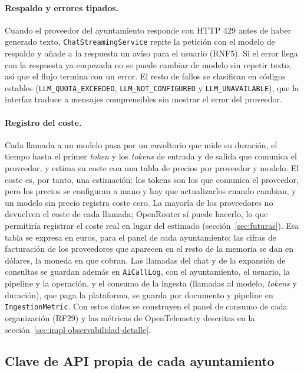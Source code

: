 \paragraph{Respaldo y errores tipados.} Cuando el proveedor del ayuntamiento responde con HTTP 429 antes de haber generado texto, \texttt{ChatStreamingService} repite la petición con el modelo de respaldo y añade a la respuesta un aviso para el usuario (RNF5). Si el error llega con la respuesta ya empezada no se puede cambiar de modelo sin repetir texto, así que el flujo termina con un error. El resto de fallos se clasifican en códigos estables (\texttt{LLM\_QUOTA\_EXCEEDED}, \texttt{LLM\_NOT\_CONFIGURED} y \texttt{LLM\_UNAVAILABLE}), que la interfaz traduce a mensajes comprensibles sin mostrar el error del proveedor.

\paragraph{Registro del coste.} Cada llamada a un modelo pasa por un envoltorio que mide su duración, el tiempo hasta el primer \emph{token} y los \emph{tokens} de entrada y de salida que comunica el proveedor, y estima su coste con una tabla de precios por proveedor y modelo. El coste es, por tanto, una estimación: los tokens son los que comunica el proveedor, pero los precios se configuran a mano y hay que actualizarlos cuando cambian, y un modelo sin precio registra coste cero. La mayoría de los proveedores no devuelven el coste de cada llamada; OpenRouter sí puede hacerlo, lo que permitiría registrar el coste real en lugar del estimado (sección~\ref{sec:futuras}). Esa tabla se expresa en euros, para el panel de cada ayuntamiento; las cifras de facturación de los proveedores que aparecen en el resto de la memoria se dan en dólares, la moneda en que cobran. Las llamadas del chat y de la expansión de consultas se guardan además en \texttt{AiCallLog}, con el ayuntamiento, el usuario, la pipeline y la operación, y el consumo de la ingesta (llamadas al modelo, \emph{tokens} y duración), que paga la plataforma, se guarda por documento y pipeline en \texttt{IngestionMetric}. Con estos datos se construyen el panel de consumo de cada organización (RF29) y las métricas de OpenTelemetry descritas en la sección~\ref{sec:impl-observabilidad-detalle}.

\subsection{Clave de API propia de cada ayuntamiento}
\label{sec:clave-propia}

